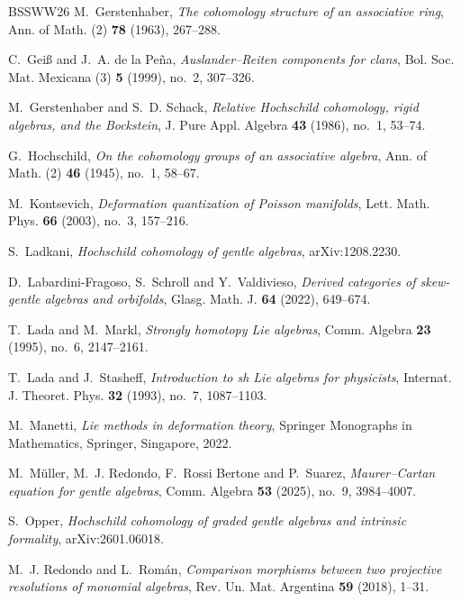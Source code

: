 \documentclass[11pt,a4paper,reqno]{amsart}
\theoremstyle{plain}
\theoremstyle{definition}
\numberwithin{equation}{section}
\begin{document}
\begin{thebibliography}{BSSWW26}
		M.~Gerstenhaber,
		\emph{The cohomology structure of an associative ring},
		Ann. of Math. (2) \textbf{78} (1963), 267--288.
		
		C.~Gei\ss{} and J.~A. de la Pe\~na,
		\emph{Auslander--Reiten components for clans},
		Bol. Soc. Mat. Mexicana (3) \textbf{5} (1999), no.~2, 307--326.
		
		M.~Gerstenhaber and S.~D. Schack,
		\emph{Relative Hochschild cohomology, rigid algebras, and the Bockstein},
		J. Pure Appl. Algebra \textbf{43} (1986), no.~1, 53--74.
		
		G.~Hochschild,
		\emph{On the cohomology groups of an associative algebra},
		Ann. of Math. (2) \textbf{46} (1945), no.~1, 58--67.
		
		M.~Kontsevich,
		\emph{Deformation quantization of Poisson manifolds},
		Lett. Math. Phys. \textbf{66} (2003), no.~3, 157--216.
		
		S.~Ladkani,
		\emph{Hochschild cohomology of gentle algebras},
		arXiv:1208.2230.
		
		D.~Labardini-Fragoso, S.~Schroll and Y.~Valdivieso,
		\emph{Derived categories of skew-gentle algebras and orbifolds},
		Glasg. Math. J. \textbf{64} (2022), 649--674.
		
		T.~Lada and M.~Markl,
		\emph{Strongly homotopy Lie algebras},
		Comm. Algebra \textbf{23} (1995), no.~6, 2147--2161.
		
		T.~Lada and J.~Stasheff,
		\emph{Introduction to sh Lie algebras for physicists},
		Internat. J. Theoret. Phys. \textbf{32} (1993), no.~7, 1087--1103.
		
		M.~Manetti,
		\emph{Lie methods in deformation theory},
		Springer Monographs in Mathematics,
		Springer, Singapore, 2022.
		
		M.~M\"uller, M.~J. Redondo, F.~Rossi Bertone and P.~Suarez,
		\emph{Maurer--Cartan equation for gentle algebras},
		Comm. Algebra \textbf{53} (2025), no.~9, 3984--4007.
		
		S.~Opper,
		\emph{Hochschild cohomology of graded gentle algebras and intrinsic formality},
		arXiv:2601.06018.
		
		M.~J. Redondo and L.~Rom\'an,
		\emph{Comparison morphisms between two projective resolutions of monomial algebras},
		Rev. Un. Mat. Argentina \textbf{59} (2018), 1--31.
		

\end{thebibliography}
\end{document}
